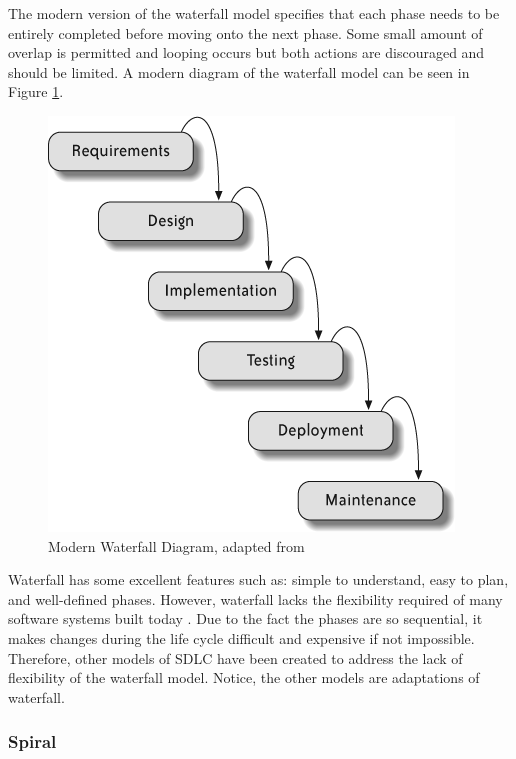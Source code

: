 \documentclass[SDSUThesis.tex]{subfiles}
\begin{document}
        The modern version of the waterfall model specifies that each phase needs 
        to be entirely completed before moving
        onto the next phase.  Some small amount of overlap is permitted and looping 
        occurs but both actions are discouraged and should be limited.  
        A modern diagram of the waterfall model can be seen in Figure \ref{fig:waterfall}.
        \begin{figure}[here]
            \centering
            \includegraphics[scale=.6]{waterfall.png}
            \caption[Modern Waterfall]
                {Modern Waterfall Diagram, adapted from \cite{Hibbs2009} }
            \label{fig:waterfall}
        \end{figure}
        
        Waterfall has some excellent features such as: simple to understand,
        easy to plan, and well-defined phases. However, waterfall lacks
        the flexibility required of many software systems built today
        \cite{Maheshwari2012}.  Due to the fact the phases are so sequential,
        it makes changes during the life cycle difficult and expensive if 
        not impossible. Therefore, other models of SDLC have been created
        to address the lack of flexibility of the waterfall model. Notice,
        the other models are  adaptations of waterfall.
    
    
    \subsubsection{Spiral}
        
\end{document}
